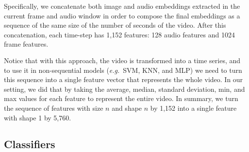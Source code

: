 Specifically, we concatenate both image and audio embeddings extracted in the current frame and audio window in order to compose the final embeddings as a sequence of the same size of the number of seconds of the video. After this concatenation, each time-step has 1,152 features: 128 audio features and 1024 frame features.

Notice that with this approach, the video is transformed into a time series, and to use it in non-sequential models (\textit{e.g.}~SVM, KNN, and MLP) we need to turn this sequence into a single feature vector that represents the whole video. In our setting, we did that by taking the average, median, standard deviation, min, and max values for each feature to represent the entire video. In summary, we turn the sequence of features with size $n$ and shape $n$ by 1,152 into a single feature with shape 1 by 5,760.

\subsection{Classifiers}
\label{subsec:classifiers}


